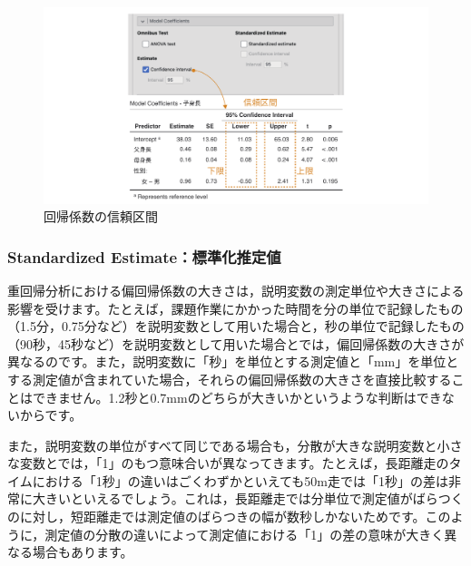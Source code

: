 \documentclass[
  12pt,
  a5jpaper,
  lualatex, ja=standard]{bxjsbook}
\begin{document}
\begin{figure}[!ht]

{\centering \includegraphics[width=1\linewidth]{images/regression/lr-model-coeff-ci} 

}

\caption{回帰係数の信頼区間}\label{fig:regression-lr-model-coeff-ci}
\end{figure}

\hypertarget{standardized-estimateux6a19ux6e96ux5316ux63a8ux5b9aux5024}{%
\subsubsection*{Standardized Estimate：標準化推定値}\label{standardized-estimateux6a19ux6e96ux5316ux63a8ux5b9aux5024}}

重回帰分析における偏回帰係数の大きさは，説明変数の測定単位や大きさによる影響を受けます。たとえば，課題作業にかかった時間を分の単位で記録したもの（1.5分，0.75分など）を説明変数として用いた場合と，秒の単位で記録したもの（90秒，45秒など）を説明変数として用いた場合とでは，偏回帰係数の大きさが異なるのです。また，説明変数に「秒」を単位とする測定値と「mm」を単位とする測定値が含まれていた場合，それらの偏回帰係数の大きさを直接比較することはできません。1.2秒と0.7mmのどちらが大きいかというような判断はできないからです。

また，説明変数の単位がすべて同じである場合も，分散が大きな説明変数と小さな変数とでは，「1」のもつ意味合いが異なってきます。たとえば，長距離走のタイムにおける「1秒」の違いはごくわずかといえても50m走では「1秒」の差は非常に大きいといえるでしょう。これは，長距離走では分単位で測定値がばらつくのに対し，短距離走では測定値のばらつきの幅が数秒しかないためです。このように，測定値の分散の違いによって測定値における「1」の差の意味が大きく異なる場合もあります。
\end{document}
